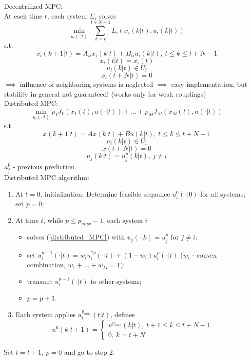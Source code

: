     
    Decentrilized MPC:\\
    At each time $t$, each system $\Sigma_i$ solves
    $$ \min_{u_i(\cdot|t)} \sum_{k=t}^{t+N-1} L_i(x_i(k|t), u_i(k|t))$$
    s.t. 
    $$x_i(k+1|t) = A_{ii}x_i(k|t)+B_{ii}u_i(k|t), \ t \le k \le t+N-1$$
    $$x_i(t|t) = x_i(t)$$
    $$u_i(k|t) \in U_i$$
    $$x_i(t+N|t) = 0$$
    $\implies$ influence of neighboring systems is neglected $\implies$ easy implementation, but stability in general not guaranteed! (works only for weak couplings)\\
    
    
    Distributed MPC:\\
    \begin{equation} \label{distributed_MPC}
        \min_{u_i(\cdot|t)} \rho_1J_1(x_1(t),u(\cdot|t))+\dots+\rho_MJ_M(x_M(t),u(\cdot|t))
    \end{equation}
    s.t. 
    $$x(k+1|t) = Ax(k|t)+Bu(k|t), \ t \le k \le t+N-1$$
    $$u_i(k|t) \in U_i$$
    $$x(t+N|t) = 0$$
    $$u_j(k|t) = u_j^p(k|t), \ j \neq i$$
    $u_j^p$ - previous prediction.\\
    
    Distributed MPC algorithm:\\
    \begin{enumerate}
        \item At $t=0$, initialization. Determine feasible sequance $u_i^0(\cdot|0)$ for all systems; set $p=0$;
        \item At time $t$, while $p \le p_{max} - 1$, each system $i$
        \begin{itemize}
            \item solves (\ref{distributed_MPC}) with $u_j(\cdot|k) = u_j^p$ for $j \neq i$;
            \item set $u_i^{p+1}(\cdot|t) = w_i u_i^{*p}(\cdot|t)+(1-w_i)u_i^p(\cdot|t)$ ($w_i$ - convex combination, $w_1 + \dots + w_M = 1$);
            \item transmit $u_i^{p+1}(\cdot|t)$ to other systems;
            \item $p=p+1$.
        \end{itemize}
        \item Each system applies $u_i^{p_{max}}(t|t)$, defines
        $$u^0(k|t+1) = \left \{ \begin{array}{ll} 
        u^{p_{max}}(k|t), \ t+1 \le k \le t+N-1 \\ 
        0, \ k = t+N 
        \end{array} \right.$$
    \end{enumerate}
    Set $t = t+1, \ p = 0$ and go to step 2.\\
    
